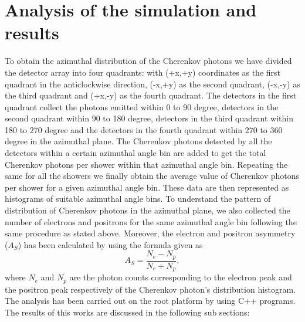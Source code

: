 \documentclass[amsmath,amssymb,showpacs,showkeywords]{revtex4}
\begin{document}
\section{Analysis of the simulation and results}
\label{sec3}
To obtain the azimuthal distribution of the Cherenkov photons we have divided 
the detector array into four quadrants: with (+x,+y) coordinates as the first 
quadrant in the anticlockwise direction, (-x,+y) as the second quadrant, 
(-x,-y) as the third quadrant and (+x,-y) as the fourth quadrant. The detectors
in the first quadrant collect the photons emitted within 0 to 90 degree, 
detectors in the second quadrant within 90 to 180 degree, detectors in the 
third quadrant within 180 to 270 degree and the detectors in the fourth 
quadrant within 270 to 360 degree in the azimuthal plane. The Cherenkov photons
detected by all the detectors within a certain azimuthal angle bin are added to 
get the total Cherenkov photons per shower within that azimuthal angle bin. 
Repeating the same for all the showers we finally obtain the average value of
Cherenkov photons per shower for a given azimuthal angle bin. These data are 
then represented as histograms of suitable azimuthal angle bins. To 
understand the pattern of distribution of Cherenkov photons in the azimuthal 
plane, we also collected the number of electrons and positrons for the same
azimuthal angle bin following the same procedure as stated above. Moreover,  
the electron and positron asymmetry ($A_{S}$) has been calculated by using the 
formula given as \cite{Goswami} $$A_{S} = \dfrac{N_{e}-N_{p}}{N_{e}+N_{p}},$$ 
where $N_{e}$ and $N_{p}$ are the photon counts corresponding to the electron 
peak and the positron peak respectively of the Cherenkov photon's distribution 
histogram. The analysis has been carried out on the root platform \cite{Root} 
by using C++ programs. The results of this works are discussed in the following sub sections:
\end{document}
